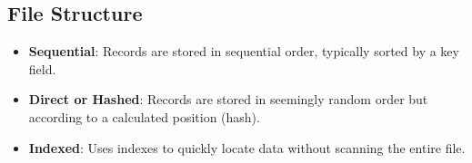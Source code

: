 \vspace{-0.3cm}
\subsection*{File Structure}
\vspace{-0.1cm}

\begin{itemize}[noitemsep,leftmargin=*] 
\leftskip-\dimexpr\leftmargin %
\item[]{\textbf{Sequential}: Records are stored in sequential order, typically sorted by a key field.}
\item[]{\textbf{Direct or Hashed}: Records are stored in seemingly random order but according to a calculated position (hash).}
\item[]{\textbf{Indexed}: Uses indexes to quickly locate data without scanning the entire file.}
\end{itemize}
